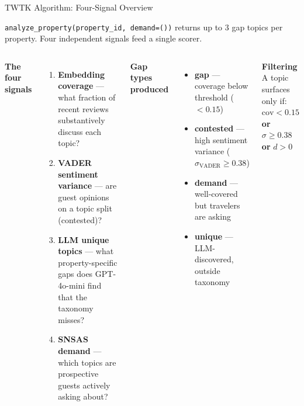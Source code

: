 \documentclass[aspectratio=169,10pt]{beamer}
\begin{document}
\begin{frame}{TWTK Algorithm: Four-Signal Overview}

\texttt{analyze\_property(property\_id, demand=())} returns up to 3
gap topics per property. Four independent signals feed a single scorer.

\medskip
\begin{columns}[T]
\textbf{The four signals}
\begin{enumerate}
  \item \textbf{Embedding coverage} — what fraction of recent reviews
        substantively discuss each topic?
  \item \textbf{VADER sentiment variance} — are guest opinions on a
        topic split (contested)?
  \item \textbf{LLM unique topics} — what property-specific gaps does
        GPT-4o-mini find that the taxonomy misses?
  \item \textbf{SNSAS demand} — which topics are prospective guests
        actively asking about?
\end{enumerate}

\textbf{Gap types produced}
\begin{itemize}
  \item \textbf{gap} — coverage below threshold ($< 0.15$)
  \item \textbf{contested} — high sentiment variance
        ($\sigma_{\text{VADER}} \geq 0.38$)
  \item \textbf{demand} — well-covered but travelers are asking
  \item \textbf{unique} — LLM-discovered, outside taxonomy
\end{itemize}

\medskip
\textbf{Filtering}\\
\small
A topic surfaces only if:
$\text{cov} < 0.15$ \textbf{or} $\sigma \geq 0.38$ \textbf{or} $d > 0$
\end{columns}
\end{frame}
\end{document}
